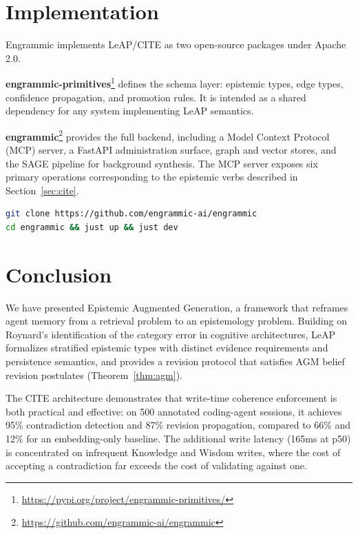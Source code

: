 \documentclass[11pt,letterpaper]{article}
\begin{document}
\section{Implementation}

Engrammic implements LeAP/CITE as two open-source packages under Apache 2.0.

\textbf{engrammic-primitives}\footnote{\url{https://pypi.org/project/engrammic-primitives/}} defines the schema layer: epistemic types, edge types, confidence propagation, and promotion rules. It is intended as a shared dependency for any system implementing LeAP semantics.

\textbf{engrammic}\footnote{\url{https://github.com/engrammic-ai/engrammic}} provides the full backend, including a Model Context Protocol (MCP) server, a FastAPI administration surface, graph and vector stores, and the SAGE pipeline for background synthesis. The MCP server exposes six primary operations corresponding to the epistemic verbs described in Section~\ref{sec:cite}.

\begin{lstlisting}[language=bash]
git clone https://github.com/engrammic-ai/engrammic
cd engrammic && just up && just dev
\end{lstlisting}

\section{Conclusion}

We have presented Epistemic Augmented Generation, a framework that reframes agent memory from a retrieval problem to an epistemology problem. Building on Roynard's identification of the category error in cognitive architectures, LeAP formalizes stratified epistemic types with distinct evidence requirements and persistence semantics, and provides a revision protocol that satisfies AGM belief revision postulates (Theorem~\ref{thm:agm}).

The CITE architecture demonstrates that write-time coherence enforcement is both practical and effective: on 500 annotated coding-agent sessions, it achieves 95\% contradiction detection and 87\% revision propagation, compared to 66\% and 12\% for an embedding-only baseline. The additional write latency (165ms at p50) is concentrated on infrequent Knowledge and Wisdom writes, where the cost of accepting a contradiction far exceeds the cost of validating against one.
\end{document}
